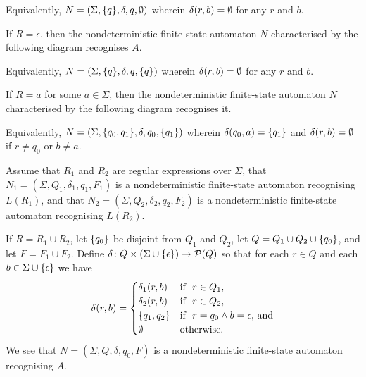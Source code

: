     \noindent Equivalently, \(N = (\Sigma, \{q\}, \delta, q, \emptyset)\) wherein
    \(\delta(r, b) = \emptyset\) for any \(r\) and \(b\).

    If \(R = \epsilon\), then the nondeterministic finite-state automaton \(N\)
    characterised by the following diagram recognises \(A\).
    \begin{figure}[!h]
        \centering
    \end{figure}

    \noindent Equivalently, \(N = (\Sigma, \{q\}, \delta, q, \{q\})\)
    wherein \(\delta(r, b) = \emptyset\) for any \(r\) and \(b\).

    If \(R = a\) for some \(a \in \Sigma\), then the nondeterministic
    finite-state automaton \(N\) characterised by the following diagram
    recognises it.
    \begin{figure}[!h]
        \centering
    \end{figure}

    \noindent Equivalently, \(N = (\Sigma, \{q_0, q_1\}, \delta, q_0,
    \{q_1\})\) wherein \(\delta(q_0, a) = \{q_1\}\) and \(\delta(r, b) =
    \emptyset\) if \(r \neq q_0\) or \(b \neq a\).

    Assume that \(R_1\) and \(R_2\) are regular expressions over \(\Sigma\),
    that \(N_1 = (\Sigma, Q_1, \delta_1, q_1, F_1)\) is a nondeterministic
    finite-state automaton recognising \(L(R_1)\), and that \(N_2 = (\Sigma,
    Q_2, \delta_2, q_2, F_2)\) is a nondeterministic finite-state automaton
    recognising \(L(R_2)\).

    If \(R = R_1 \cup R_2\), let \(\{q_0\}\) be disjoint from \(Q_1\) and
    \(Q_2\), let \(Q = Q_1 \cup Q_2 \cup \{q_0\}\), and let \(F = F_1 \cup
    F_2\). Define \(\delta\colon Q \times (\Sigma \cup
    \{\epsilon\})\to\mathcal{P}(Q)\) so that for each \(r \in Q\) and each \(b \in
    \Sigma \cup \{\epsilon\}\) we have
    \[
        \delta(r, b) = \begin{cases}
            \delta_1(r, b) & \text{if }\ r \in Q_1,\\
            \delta_2(r, b) & \text{if }\ r \in Q_2,\\
            \{q_1, q_2\} & \text{if }\ r = q_0 \land b = \epsilon \text{,
            and}\\
            \emptyset & \text{otherwise.}
        \end{cases}
    \]
    We see that \(N = (\Sigma, Q, \delta, q_0, F)\) is a nondeterministic
    finite-state automaton recognising \(A\).

